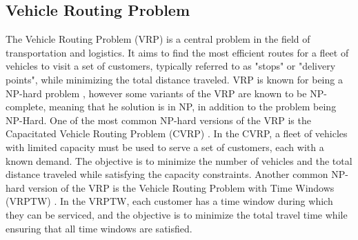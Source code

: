 \subsection{Vehicle Routing Problem}\label{subsec:vehicle-routing-problem}

The Vehicle Routing Problem (VRP) is a central problem in the field of transportation and logistics.
It aims to find the most efficient routes for a fleet of vehicles to visit a set of customers,
typically referred to as "stops" or "delivery points", while minimizing the total distance traveled.
VRP is known for being a NP-hard problem \cite{toth2002vehicle}, however some variants of the VRP are known to be NP-complete, meaning that
he solution is in NP, in addition to the problem being NP-Hard.
One of the most common NP-hard versions of the VRP is the Capacitated Vehicle Routing Problem (CVRP) \cite{Toth2014}.
In the CVRP, a fleet of vehicles with limited capacity must be used to serve a set of customers, each with a known
demand. The objective is to minimize the number of vehicles and the total distance traveled while satisfying
the capacity constraints.
Another common NP-hard version of the VRP is the Vehicle Routing Problem with Time Windows (VRPTW) \cite{Desrochers1992}.
In the VRPTW, each customer has a time window during which they can be serviced, and the objective is to minimize
the total travel time while ensuring that all time windows are satisfied.

